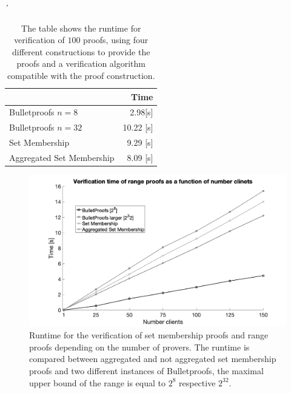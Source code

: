 ´
\begin{table}
\caption{The table shows the runtime for verification of $100$ proofs, using four different constructions to provide the proofs and a verification algorithm compatible with the proof construction. }
\centering
\label{tab:CompareToBulletproof}
\begin{tabular}{l | r }
\toprule
	  											& Time\\	\midrule
  Bulletproofs $n=8$					&   2.98[s] 		\\ 
  Bulletproofs $n=32$					&   10.22 [s]		\\ 
  Set Membership					&   9.29 [s] \\
  Aggregated Set Membership	&   8.09 [s]	 \\ 
  \bottomrule 
\end{tabular}
\end{table}

 \begin{figure}[]
\caption{Runtime for the verification of set membership proofs and range proofs depending on the number of provers. The runtime is compared between aggregated and not aggregated set membership proofs and two different instances of Bulletproofs, the maximal upper bound of the range is equal to $2^8$ respective $2^{32}$.}
\label{fig:NrClients}
\includegraphics[width=0.9\linewidth]{./figure/newverification_nrClients.png}
\end{figure}
